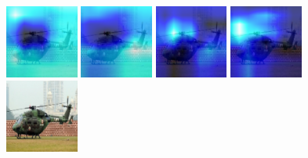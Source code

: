 \begin{figure}[H]
\centering
{}
  {\includegraphics[height=2.4cm, width=2.4cm]{images/real-images/gradcam/5-5/1/Heat_map_of_iterations_0.png}}
  {\includegraphics[height=2.4cm, width=2.4cm]{images/real-images/gradcam/5-5/1/Heat_map_of_iterations_1.png}}
  {\includegraphics[height=2.4cm, width=2.4cm]{images/real-images/gradcam/5-5/1/Heat_map_of_iterations_3.png}}
%
  {\includegraphics[height=2.4cm, width=2.4cm]{images/real-images/gradcam/5-5/1/Heat_map_of_iterations_5.png}}
  {\includegraphics[height=2.4cm, width=2.4cm]{images/real-images/gradcam/5-5/1/Test_Images.png}}


\end{figure}
